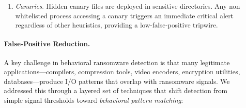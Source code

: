\documentclass[twocolumn, 10pt]{scrartcl}
\begin{document}
\begin{enumerate}
    \item \textit{Canaries.} Hidden canary files are deployed in sensitive directories. 
    Any non-whitelisted process accessing a canary triggers an immediate critical alert 
    regardless of other heuristics, providing a low-false-positive tripwire. 
\end{enumerate}

\paragraph{False-Positive Reduction.}
A key challenge in behavioral ransomware detection is that many legitimate 
applications---compilers, compression tools, video encoders, encryption utilities, 
databases---produce I/O patterns that overlap with ransomware signals. 
We addressed this through a layered set of techniques that shift detection from 
simple signal thresholds toward \emph{behavioral pattern matching}:
\end{document}
